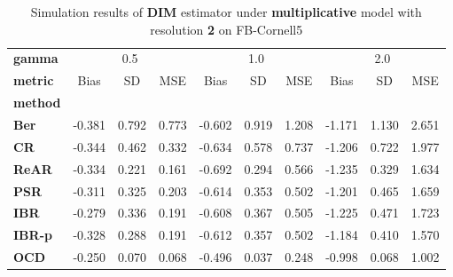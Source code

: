 \begin{table}
\centering
\caption{Simulation results of \textbf{DIM} estimator under \textbf{multiplicative} model with resolution \textbf{2} on FB-Cornell5}
\begin{tabular}{lccccccccc}
\toprule
\textbf{gamma} & \multicolumn{3}{c}{0.5} & \multicolumn{3}{c}{1.0} & \multicolumn{3}{c}{2.0} \\
\textbf{metric} &   Bias &     SD &    MSE &   Bias &     SD &    MSE &   Bias &     SD &    MSE \\
\textbf{method} &        &        &        &        &        &        &        &        &        \\
\midrule
\textbf{Ber} & -0.381 &  0.792 &  0.773 & -0.602 &  0.919 &  1.208 & -1.171 &  1.130 &  2.651 \\
\textbf{CR} & -0.344 &  0.462 &  0.332 & -0.634 &  0.578 &  0.737 & -1.206 &  0.722 &  1.977 \\
\textbf{ReAR} & -0.334 &  0.221 &  0.161 & -0.692 &  0.294 &  0.566 & -1.235 &  0.329 &  1.634 \\
\textbf{PSR} & -0.311 &  0.325 &  0.203 & -0.614 &  0.353 &  0.502 & -1.201 &  0.465 &  1.659 \\
\textbf{IBR} & -0.279 &  0.336 &  0.191 & -0.608 &  0.367 &  0.505 & -1.225 &  0.471 &  1.723 \\
\textbf{IBR-p} & -0.328 &  0.288 &  0.191 & -0.612 &  0.357 &  0.502 & -1.184 &  0.410 &  1.570 \\
\textbf{OCD} & -0.250 &  0.070 &  0.068 & -0.496 &  0.037 &  0.248 & -0.998 &  0.068 &  1.002 \\
\bottomrule
\end{tabular}
\end{table}
